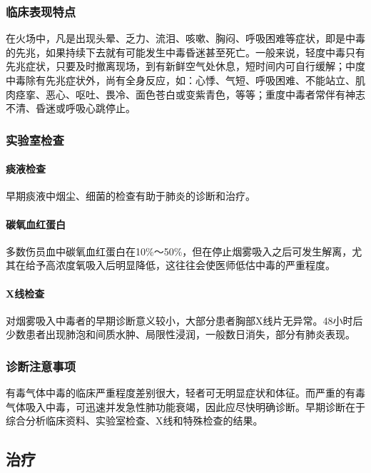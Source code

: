 \subsubsection{临床表现特点}

在火场中，凡是出现头晕、乏力、流泪、咳嗽、胸闷、呼吸困难等症状，即是中毒的先兆，如果持续下去就有可能发生中毒昏迷甚至死亡。一般来说，轻度中毒只有先兆症状，只要及时撤离现场，到有新鲜空气处休息，短时间内可自行缓解；中度中毒除有先兆症状外，尚有全身反应，如：心悸、气短、呼吸困难、不能站立、肌肉痉挛、恶心、呕吐、畏冷、面色苍白或变紫青色，等等；重度中毒者常伴有神志不清、昏迷或呼吸心跳停止。

\subsubsection{实验室检查}

\paragraph{痰液检查}

早期痰液中烟尘、细菌的检查有助于肺炎的诊断和治疗。

\paragraph{碳氧血红蛋白}

多数伤员血中碳氧血红蛋白在10\%～50\%，但在停止烟雾吸入之后可发生解离，尤其在给予高浓度氧吸入后明显降低，这往往会使医师低估中毒的严重程度。

\paragraph{X线检查}

对烟雾吸入中毒者的早期诊断意义较小，大部分患者胸部X线片无异常。48小时后少数患者出现肺泡和间质水肿、局限性浸润，一般数日消失，部分有肺炎表现。

\subsubsection{诊断注意事项}

有毒气体中毒的临床严重程度差别很大，轻者可无明显症状和体征。而严重的有毒气体吸入中毒，可迅速并发急性肺功能衰竭，因此应尽快明确诊断。早期诊断在于综合分析临床资料、实验室检查、X线和特殊检查的结果。

\subsection{治疗}

